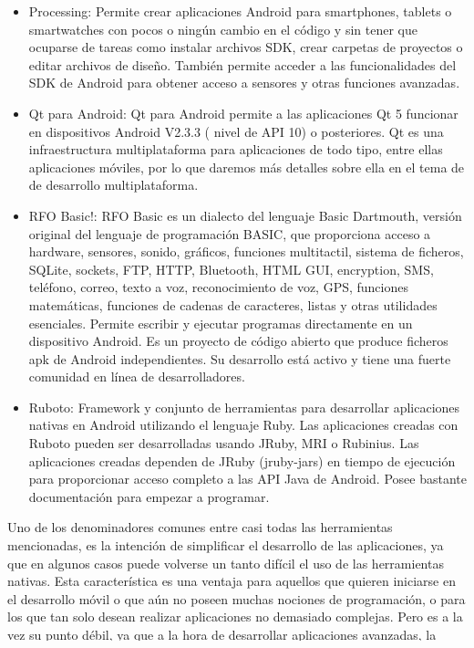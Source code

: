 \documentclass[
10pt, %
a4paper, %
oneside, %
headinclude,footinclude, %
BCOR5mm, %
]{scrartcl}
\begin{document}
\begin{itemize}
	\item Processing: Permite crear aplicaciones Android para smartphones, tablets o smartwatches con pocos o ningún cambio en el código y sin tener que ocuparse de tareas como instalar archivos SDK, crear carpetas de proyectos o editar archivos de diseño. También permite acceder a las funcionalidades del SDK de Android para obtener acceso a sensores y otras funciones avanzadas.

	\item Qt para Android: Qt para Android permite a las aplicaciones Qt 5 funcionar en dispositivos Android V2.3.3 ( nivel de API 10) o posteriores. Qt es una infraestructura multiplataforma para aplicaciones de todo tipo, entre ellas aplicaciones móviles, por lo que daremos más detalles sobre ella en el tema de de desarrollo multiplataforma.

	\item RFO Basic!: RFO Basic es un dialecto del lenguaje Basic Dartmouth, versión original del lenguaje de programación BASIC, que proporciona acceso a hardware, sensores, sonido, gráficos, funciones multitactil, sistema de ficheros, SQLite, sockets, FTP, HTTP, Bluetooth, HTML GUI, encryption, SMS, teléfono, correo, texto a voz, reconocimiento de voz, GPS, funciones matemáticas, funciones de cadenas de caracteres, listas y otras utilidades esenciales. Permite escribir y ejecutar programas directamente en un dispositivo Android. Es un proyecto de código abierto que produce ficheros apk de Android independientes. Su desarrollo está activo y tiene una fuerte comunidad en línea de desarrolladores.

	\item Ruboto: Framework y conjunto de herramientas para desarrollar aplicaciones nativas en Android utilizando el lenguaje Ruby. Las aplicaciones creadas con Ruboto pueden ser desarrolladas usando JRuby, MRI o Rubinius. Las aplicaciones creadas dependen de JRuby (jruby-jars) en tiempo de ejecución para proporcionar acceso completo a las API Java de Android. Posee bastante documentación para empezar a programar.
\end{itemize}

Uno de los denominadores comunes entre casi todas las herramientas mencionadas, es la intención de simplificar el desarrollo de las aplicaciones, ya que en algunos casos puede volverse un tanto difícil el uso de las herramientas nativas. Esta característica es una ventaja para aquellos que quieren iniciarse en el desarrollo móvil o que aún no poseen muchas nociones de programación, o para los que tan solo desean realizar aplicaciones no demasiado complejas. Pero es a la vez su punto débil, ya que a la hora de desarrollar aplicaciones avanzadas, la mayoría de estas herramientas seguramente se quedarían cortas para poder desarrollar todas las funcionalidades deseadas. Otra posible ventaja, es que emplean diferentes lenguajes, que podrían permitir al usuario programar aplicaciones Android en lenguajes que ya conozca sin tener que adentrarse en el aprendizaje de un nuevo lenguaje, algo que muchas veces frena a los desarrolladores a la hora de trabajar en un nuevo sistema operativo.
\end{document}
